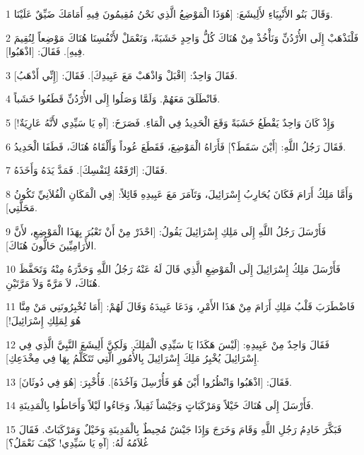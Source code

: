 \par 1 وَقَالَ بَنُو الأَنْبِيَاءِ لأَلِيشَعَ: [هُوَذَا الْمَوْضِعُ الَّذِي نَحْنُ مُقِيمُونَ فِيهِ أَمَامَكَ ضَيِّقٌ عَلَيْنَا.
\par 2 فَلْنَذْهَبْ إِلَى الأُرْدُنِّ وَنَأْخُذْ مِنْ هُنَاكَ كُلُّ وَاحِدٍ خَشَبَةً، وَنَعْمَلْ لأَنْفُسِنَا هُنَاكَ مَوْضِعاً لِنُقِيمَ فِيهِ]. فَقَالَ: [اذْهَبُوا].
\par 3 فَقَالَ وَاحِدٌ: [اقْبَلْ وَاذْهَبْ مَعَ عَبِيدِكَ]. فَقَالَ: [إِنِّي أَذْهَبُ].
\par 4 فَانْطَلَقَ مَعَهُمْ. وَلَمَّا وَصَلُوا إِلَى الأُرْدُنِّ قَطَعُوا خَشَباً.
\par 5 وَإِذْ كَانَ وَاحِدٌ يَقْطَعُ خَشَبَةً وَقَعَ الْحَدِيدُ فِي الْمَاءِ. فَصَرَخَ: [آهِ يَا سَيِّدِي لأَنَّهُ عَارِيَةٌ!]
\par 6 فَقَالَ رَجُلُ اللَّهِ: [أَيْنَ سَقَطَ؟] فَأَرَاهُ الْمَوْضِعَ، فَقَطَعَ عُوداً وَأَلْقَاهُ هُنَاكَ، فَطَفَا الْحَدِيدُ.
\par 7 فَقَالَ: [ارْفَعْهُ لِنَفْسِكَ]. فَمَدَّ يَدَهُ وَأَخَذَهُ.
\par 8 وَأَمَّا مَلِكُ أَرَامَ فَكَانَ يُحَارِبُ إِسْرَائِيلَ، وَتَآمَرَ مَعَ عَبِيدِهِ قَائِلاً: [فِي الْمَكَانِ الْفُلاَنِيِّ تَكُونُ مَحَلَّتِي].
\par 9 فَأَرْسَلَ رَجُلُ اللَّهِ إِلَى مَلِكِ إِسْرَائِيلَ يَقُولُ: [احْذَرْ مِنْ أَنْ تَعْبُرَ بِهَذَا الْمَوْضِعِ، لأَنَّ الأَرَامِيِّينَ حَالُّونَ هُنَاكَ].
\par 10 فَأَرْسَلَ مَلِكُ إِسْرَائِيلَ إِلَى الْمَوْضِعِ الَّذِي قَالَ لَهُ عَنْهُ رَجُلُ اللَّهِ وَحَذَّرَهُ مِنْهُ وَتَحَفَّظَ هُنَاكَ، لاَ مَرَّةً وَلاَ مَرَّتَيْنِ.
\par 11 فَاضْطَرَبَ قَلْبُ مَلِكِ أَرَامَ مِنْ هَذَا الأَمْرِ، وَدَعَا عَبِيدَهُ وَقَالَ لَهُمْ: [أَمَا تُخْبِرُونَنِي مَنْ مِنَّا هُوَ لِمَلِكِ إِسْرَائِيلَ!]
\par 12 فَقَالَ وَاحِدٌ مِنْ عَبِيدِهِ: [لَيْسَ هَكَذَا يَا سَيِّدِي الْمَلِكَ. وَلَكِنَّ أَلِيشَعَ النَّبِيَّ الَّذِي فِي إِسْرَائِيلَ يُخْبِرُ مَلِكَ إِسْرَائِيلَ بِالأُمُورِ الَّتِي تَتَكَلَّمُ بِهَا فِي مِخْدَعِكِ].
\par 13 فَقَالَ: [اذْهَبُوا وَانْظُرُوا أَيْنَ هُوَ فَأُرْسِلَ وَآخُذَهُ]. فَأُخْبِرَ: [هُوَ فِي دُوثَانَ].
\par 14 فَأَرْسَلَ إِلَى هُنَاكَ خَيْلاً وَمَرْكَبَاتٍ وَجَيْشاً ثَقِيلاً، وَجَاءُوا لَيْلاً وَأَحَاطُوا بِالْمَدِينَةِ.
\par 15 فَبَكَّرَ خَادِمُ رَجُلِ اللَّهِ وَقَامَ وَخَرَجَ وَإِذَا جَيْشٌ مُحِيطٌ بِالْمَدِينَةِ وَخَيْلٌ وَمَرْكَبَاتٌ. فَقَالَ غُلاَمُهُ لَهُ: [آهِ يَا سَيِّدِي! كَيْفَ نَعْمَلُ؟]
